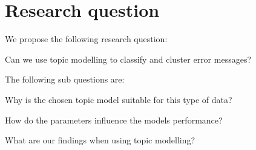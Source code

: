 \section{Research question}\label{introduction:Researchquestion}
We propose the following research question:

Can we use topic modelling to classify and cluster error messages?

The following sub questions are:

Why is the chosen topic model suitable for this type of data?

How do the parameters influence the models performance?

What are our findings when using topic modelling?


\begin{comment}
What are the optimal parameters?

What are the pro's and con's of using LDA?

subquestions:
Why is LDA suitable for this type of data 

How do the parameters influence the models performance?

What are the pro's and con's of using LDA?

What other methods are available to solve this error clustering?


\end{comment}


\begin{comment}

How do we define similair messages?

Can we cluster these error messages to find patterns?

Wat ik zou verwachten in je scriptie zijn de volgende topics
•	Wat is het probleem (de probleemstelling)?
•	Welke mogelijkheden zijn er om dit probleem op te lossen?
•	Welke methode heb je gekozen, en vooral uitleggen waarom deze methode volgens jou de beste is?
•	Hoe heb je vastgesteld dat de gekozen oplossing de beste is?
•	Wat is de uitkomst?
•	Wat zijn de voor en nadelen van het gekozen model, wat zijn de beperkingen, wat is de optimale modelering en waarom?
Zijn deze onderwerpen voldoende afgedicht in onderstaande structuur?

Ik ben veel meer geïnteresseerd in de onderbouwing:
•	Wat is de (onze) probleem omschrijving
Finding structures in syslogs to cluster undiscovered syslogs with errors
•	Waarom kies je LDA om dit probleem te lijf te gaan
o	Pro’s / con’s
o	Alternatieven
•	Hoe moet LDA gebruikt worden
o	Welke specifieke tuning heb je gebruikt
o	Hoe beinvloed de aanpassingen van parameters de uitkomst


\textbf{Can we make a reliable model for error detection in system logs?}

 \end{comment}
 
